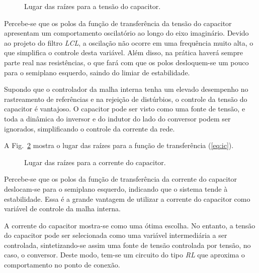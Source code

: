     \begin{figure}[htb]
        \centering{
           }
        \renewcommand\figurename{Fig.}
        \caption{Lugar das raízes para a tensão do capacitor.}
        \label{fig:rlocus_vc}
    \end{figure}

    Percebe-se que os polos da função de transferência da tensão do capacitor
    apresentam um comportamento oscilatório ao longo do eixo imaginário. Devido
    ao projeto do filtro \emph{LCL}, a oscilação não ocorre em uma frequência
    muito alta, o que simplifica o controle desta variável. Além disso, na prática
    haverá sempre parte real nas resistências, o que fará com que os polos desloquem-se
    um pouco para o semiplano esquerdo, saindo do limiar de estabilidade.

    Supondo que o controlador da malha interna tenha um elevado desempenho
    no rastreamento de referências e na rejeição de distúrbios,
    o controle da tensão do capacitor é vantajoso. O capacitor
    pode ser visto como uma fonte de tensão, e toda a dinâmica
    do inversor e do indutor do lado do conversor podem ser ignorados,
    simplificando o controle da corrente da rede.

    A Fig.~\ref{fig:rlocus_ic} mostra o lugar das raízes para a função de
    transferência (\ref{eq:ic}).

    \begin{figure}[htb]
        \centering{
            }
        \renewcommand\figurename{Fig.}
        \caption{Lugar das raízes para a corrente do capacitor.}
        \label{fig:rlocus_ic}
    \end{figure}

    Percebe-se que os polos da função de transferência da corrente do capacitor
    deslocam-se para o semiplano esquerdo, indicando que o sistema tende à
    estabilidade. Essa é a grande vantagem de utilizar a corrente do capacitor
    como variável de controle da malha interna.

    A corrente do capacitor mostra-se como uma ótima escolha. No entanto, a tensão
    do capacitor pode ser selecionada como uma variável intermediária a ser controlada,
    sintetizando-se assim uma fonte de tensão controlada por tensão, no caso, o
    conversor. Deste modo, tem-se um circuito do tipo \emph{RL} que aproxima o
    comportamento no ponto de conexão.

